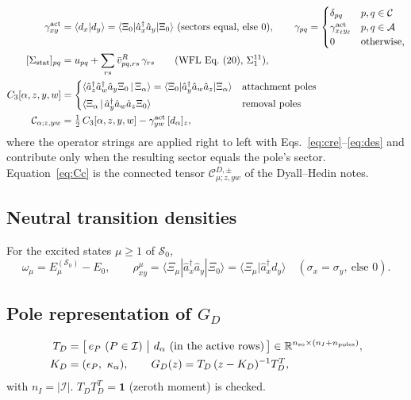 \documentclass[11pt,a4paper]{article}
\newcommand{\braket}[1]{\langle#1\rangle}
\newcommand{\vbR}{\bar v^{R}}
\newcommand{\so}{\mathrm{so}}
\newcommand{\act}{\mathrm{act}}
\begin{document}
\begin{align}
  \gamma^{\act}_{xy}&=\braket{d_x|d_y}=\braket{\Xi_0|\hat a_x^\dagger\hat a_y|\Xi_0}
  \ (\text{sectors equal, else }0),\qquad
  \gamma_{pq}=\begin{cases}\delta_{pq}&p,q\in\mathcal C\\ \gamma^{\act}_{x_\ell y_\ell}&p,q\in\mathcal A\\0&\text{otherwise,}\end{cases}
  \label{eq:gamma-so}\\
  [\Sigma_{\rm stat}]_{pq}&=u_{pq}+\sum_{rs}\vbR_{pq,rs}\,\gamma_{rs}
  \qquad(\text{WFL Eq.~(20), }\Sigma_1^{11}),
  \label{eq:sigma-stat}\\
  C_3[\alpha,z,y,w]&=\begin{cases}
  \braket{\hat a_z^\dagger\hat a_w^\dagger\hat a_y\Xi_0\,|\,\Xi_\alpha}
  =\braket{\Xi_0|\hat a_y^\dagger\hat a_w\hat a_z|\Xi_\alpha}&\text{attachment poles}\\[1mm]
  \braket{\Xi_\alpha\,|\,\hat a_y^\dagger\hat a_w\hat a_z\Xi_0}&\text{removal poles}
  \end{cases}
  \label{eq:C3}\\
  \mathcal C_{\alpha;z,yw}&=\tfrac12\,C_3[\alpha,z,y,w]-\gamma^{\act}_{yw}\,[d_\alpha]_z ,
  \label{eq:Cc}
\end{align}
where the operator strings are applied right to left with
Eqs.~\eqref{eq:cre}--\eqref{eq:des} and contribute only when the resulting
sector equals the pole's sector.  Equation~\eqref{eq:Cc} is the connected
tensor $\mathcal C^{D,\pm}_{\mu;z,yw}$ of the Dyall--Hedin notes.

\subsection{Neutral transition densities}

For the excited states $\mu\ge1$ of $\mathcal S_0$,
\begin{equation}
  \omega_\mu=E^{(\mathcal S_0)}_\mu-E_0,\qquad
  \rho^\mu_{xy}=\braket{\Xi_\mu|\hat a_x^\dagger\hat a_y|\Xi_0}
  =\braket{\Xi_\mu|\hat a_x^\dagger d_y}\quad(\sigma_x=\sigma_y,\ \text{else }0).
  \label{eq:tdm}
\end{equation}

\subsection{Pole representation of $G_D$}

\begin{align}
  T_D&=\bigl[\,e_P\ (P\in\mathcal I)\ \big|\ d_\alpha\ (\text{in the active rows})\,\bigr]\in\mathbb R^{n_{\so}\times(n_I+n_{\rm poles})},
  \label{eq:GD-pole}\\
  K_D&=(\epsilon_P,\ \kappa_\alpha),\qquad
  G_D(z)=T_D\,(z-K_D)^{-1}T_D^{T},\nonumber
\end{align}
with $n_I=|\mathcal I|$.  $T_DT_D^{T}=\mathbf 1$ (zeroth moment) is checked.
\end{document}
